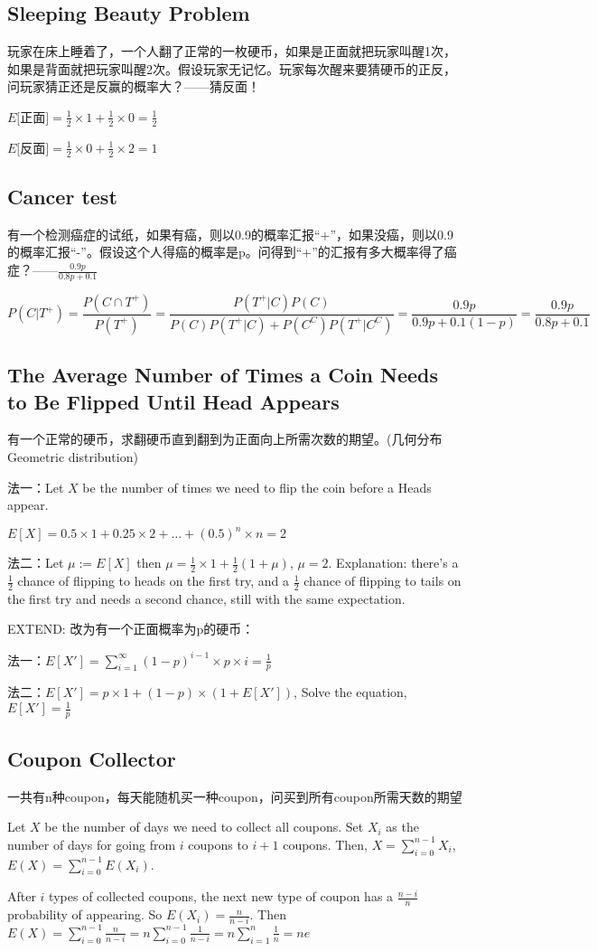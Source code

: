 \documentclass[12pt,a4paper]{ctexrep}
\begin{document}
\subsection{Sleeping Beauty Problem}
玩家在床上睡着了，一个人翻了正常的一枚硬币，如果是正面就把玩家叫醒1次，如果是背面就把玩家叫醒2次。假设玩家无记忆。玩家每次醒来要猜硬币的正反，问玩家猜正还是反赢的概率大？——猜反面！

$E[$正面$] = \frac{1}{2}\times 1 + \frac{1}{2}\times 0 = \frac{1}{2}$

$E[$反面$] = \frac{1}{2}\times 0 + \frac{1}{2}\times 2 = 1$
\subsection{Cancer test}
有一个检测癌症的试纸，如果有癌，则以0.9的概率汇报“+”，如果没癌，则以0.9的概率汇报“-”。假设这个人得癌的概率是p。问得到“+”的汇报有多大概率得了癌症？——$\frac{0.9p}{0.8p+0.1}$

\[P(C|T^+) = \frac{P(C\cap T^+)}{P(T^+)} = \frac{P(T^+|C)P(C)}{P(C)P(T^+|C)+P(C^C)P(T^+|C^C)} = \frac{0.9p}{0.9p+0.1(1-p)} = \frac{0.9p}{0.8p+0.1}\]

\subsection{The Average Number of Times a Coin Needs to Be Flipped Until Head Appears}
有一个正常的硬币，求翻硬币直到翻到为正面向上所需次数的期望。(几何分布Geometric distribution)

法一：Let $X$ be the number of times we need to flip the coin before a Heads appear.

$E[X] = 0.5\times 1 + 0.25\times 2 + \dots + (0.5)^n \times n = 2$

法二：Let $\mu := E[X]$ then $\mu = \frac{1}{2}\times 1 + \frac{1}{2}(1+\mu)$, $\mu = 2$. Explanation: there's a $\frac{1}{2}$ chance of flipping to heads on the first try, and a $\frac{1}{2}$ chance of flipping to tails on the first try and needs a second chance, still with the same expectation.

EXTEND: 改为有一个正面概率为p的硬币：

法一：$E[X'] = \sum_{i=1}^{\infty} (1-p)^{i-1} \times p \times i = \frac{1}{p}$

法二：$E[X'] = p \times 1 + (1-p) \times (1+E[X'])$, Solve the equation, $E[X'] = \frac{1}{p}$

\subsection{Coupon Collector}
一共有n种coupon，每天能随机买一种coupon，问买到所有coupon所需天数的期望

Let $X$ be the number of days we need to collect all coupons. Set $X_i$ as the number of days for going from $i$ coupons to $i+1$ coupons. Then, $X = \sum_{i=0}^{n-1} X_i$, $E(X) = \sum_{i=0}^{n-1} E(X_i)$.

After $i$ types of collected coupons, the next new type of coupon has a $\frac{n-i}{n}$ probability of appearing. So $E(X_i) = \frac{n}{n-i}$. Then $E(X) = \sum_{i=0}^{n-1} \frac{n}{n-i} = n \sum_{i=0}^{n-1}\frac{1}{n-i} = n \sum_{i=1}^{n} \frac{1}{n} = ne$
\ifdebug
\end{document}
